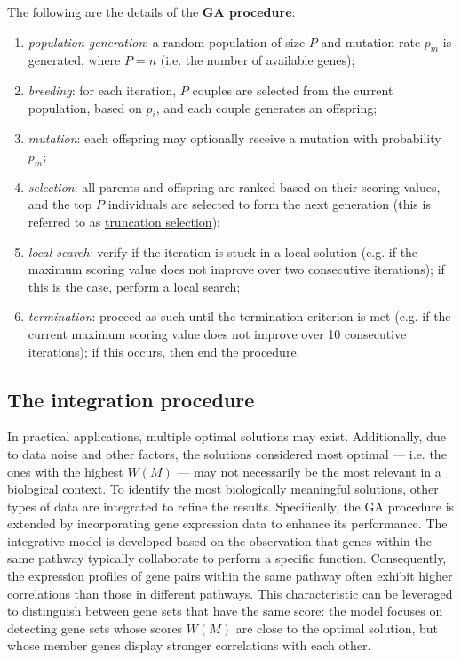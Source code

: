 \begin{definition}[GA procedure]
    The following are the details of the \textbf{GA procedure}:

    \begin{enumerate}
        \item \textit{population generation}: a random population of size $P$ and mutation rate $p_m$ is generated, where $P = n$ (i.e. the number of available genes);
        \item \textit{breeding}: for each iteration, $P$ couples are selected from the current population, based on $p_i$, and each couple generates an offspring;
        \item \textit{mutation}: each offspring may optionally receive a mutation with probability $p_m$;
        \item \textit{selection}: all parents and offspring are ranked based on their scoring values, and the top $P$ individuals are selected to form the next generation (this is referred to as \href{https://en.wikipedia.org/wiki/Truncation_selection}{truncation selection});
        \item \textit{local search}: verify if the iteration is stuck in a local solution (e.g. if the maximum scoring value does not improve over two consecutive iterations); if this is the case, perform a local search;
        \item \textit{termination}: proceed as such until the termination criterion is met (e.g. if the current maximum scoring value does not improve over 10 consecutive iterations); if this occurs, then end the procedure.
    \end{enumerate}
\end{definition}

\subsection{The integration procedure}

In practical applications, multiple optimal solutions may exist. Additionally, due to data noise and other factors, the solutions considered most optimal --- i.e. the ones with the highest $W(M)$ --- may not necessarily be the most relevant in a biological context. To identify the most biologically meaningful solutions, other types of data are integrated to refine the results. Specifically, the GA procedure is extended by incorporating gene expression data to enhance its performance. The integrative model is developed based on the observation that genes within the same pathway typically collaborate to perform a specific function. Consequently, the expression profiles of gene pairs within the same pathway often exhibit higher correlations than those in different pathways. This characteristic can be leveraged to distinguish between gene sets that have the same score: the model focuses on detecting gene sets whose scores $W(M)$ are close to the optimal solution, but whose member genes display stronger correlations with each other.

